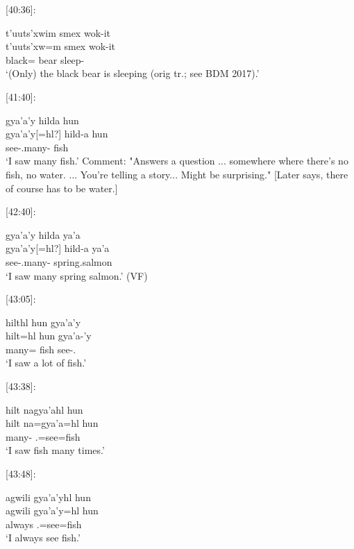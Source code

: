 [40:36]: 
\begin{exe}
    \ex \glll 
    t'uuts'xwim smex wok-it \\
    t'uuts'xw=m smex wok-it \\
    black=\Attr{} bear sleep-\Sx{} \\
    \glt `(Only) the black bear is sleeping (orig tr.; see BDM 2017).'
\end{exe}


[41:40]: 

\begin{exe}
    \ex \glll
    gya'a'y hilda hun \\
    gya'a'y[=hl?] hild-a hun \\
    see-\Fsg.\Ii[=\Cn?] many-\Attr{} fish \\
    \glt `I saw many fish.' 
    Comment: "Answers a question ... somewhere where there’s no fish, no water. ... You’re telling a story... Might be surprising." [Later says, there of course has to be water.]
\end{exe}

[42:40]:
\begin{exe}
    \ex \glll
    gya'a'y hilda ya'a \\
    gya'a'y[=hl?] hild-a ya'a \\
    see-\Fsg.\Ii[=\Cn?] many-\Attr{} spring.salmon \\
    \glt `I saw many spring salmon.' (VF) 
\end{exe}

[43:05]: 
\begin{exe}
    \ex \glll 
    hilthl hun gya'a'y  \\ 
    hilt=hl hun gya'a-'y  \\ 
    many=\Cn{} fish see-\Fsg.\Ii  \\
    \glt `I saw a lot of fish.'
\end{exe}

[43:38]:
\begin{exe}
    \ex \glll
    hilt nagya'ahl hun \\ 
    hilt na=gya'a=hl hun \\ 
    many-\Attr{} \Fsg.\I=see=\Cn fish \\
    \glt `I saw fish many times.'
\end{exe}

[43:48]:
\begin{exe}
    \ex \glll
    agwili gya'a'yhl hun \\ 
    agwili gya'a'y=hl hun \\ 
    always \Fsg.\I=see=\Cn fish \\
    \glt `I always see fish.'
\end{exe}

